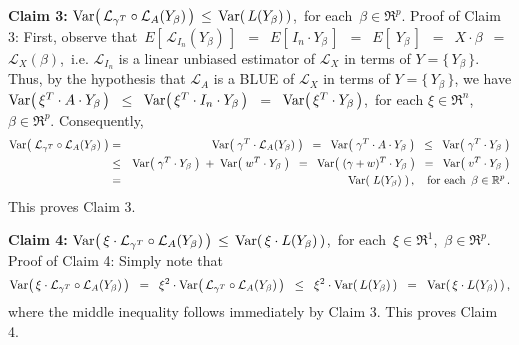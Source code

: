 \vskip 0.5cm
\noindent
\textbf{Claim 3:}\quad
$\textnormal{Var}\!\left(\,\mathcal{L}_{\gamma^{T}}\circ\mathcal{L}_{A}(Y_{\beta})\,\right)
\,\leq\,
	\textnormal{Var}\!\left(\,L(Y_{\beta})\,\right)$,\,
for each \,$\beta\in\Re^{p}$.
\vskip 0.1cm
\noindent
Proof of Claim 3:\quad
First, observe that
\,$E\!\left[\,\mathcal{L}_{I_{n}}(Y_{\beta})\,\right]$
\,$=$\, $E\!\left[\,I_{n} \cdot Y_{\beta}\,\right]$
\,$=$\, $E\!\left[\;Y_{\beta}\,\right]$
\,$=$\, $X \cdot \beta$
\,$=$\, $\mathcal{L}_{X}(\beta)$,\,
i.e. $\mathcal{L}_{I_{n}}$ is a linear unbiased estimator of $\mathcal{L}_{X}$
in terms of $Y = \{\,Y_{\beta}\,\}$.
Thus, by the hypothesis that $\mathcal{L}_{A}$ is a BLUE of $\mathcal{L}_{X}$ in terms of $Y = \{\,Y_{\beta}\,\}$,
we have
$\textnormal{Var}\!\left(\,\xi^{T} \cdot A \cdot Y_{\beta}\,\right)$
\,$\leq$\, $\textnormal{Var}\!\left(\,\xi^{T} \cdot I_{n} \cdot Y_{\beta}\,\right)$
\,$=$\, $\textnormal{Var}\!\left(\,\xi^{T} \cdot Y_{\beta}\,\right)$,\,
for each $\xi \in \Re^{n}$, $\beta\in\Re^{p}$.
Consequently,
\begin{eqnarray*}
\Var\!\left(\; \mathcal{L}_{\gamma^{T}} \circ \mathcal{L}_{A}(Y_{\beta}) \;\right)
&=&
	\Var\!\left(\; \gamma^{T} \cdot \mathcal{L}_{A}(Y_{\beta}) \;\right)
\;\; = \;\;
	\Var\!\left(\; \gamma^{T} \cdot A \cdot Y_{\beta} \;\right)
\;\; \leq \;\;
	\Var\!\left(\; \gamma^{T} \cdot Y_{\beta} \;\right)
\\
&\leq&
	\Var\!\left(\; \gamma^{T} \cdot Y_{\beta} \;\right)
	\; + \;
	\Var\!\left(\; w^{T} \cdot Y_{\beta} \;\right)
\;\;=\;\;
	\Var\!\left(\; (\gamma + w)^{T} \cdot Y_{\beta} \;\right)
\;\; = \;\;
	\Var\!\left(\; v^{T} \cdot Y_{\beta} \;\right)
\\
&=&
	\Var\!\left(\; L(Y_{\beta}) \;\right),
\quad
\textnormal{for each \,$\beta\in\Re^{p}$}\,.
\end{eqnarray*}
This proves Claim 3.

\vskip 0.5cm
\noindent
\textbf{Claim 4:}\quad
$\textnormal{Var}\!\left(\,\xi\cdot\mathcal{L}_{\gamma^{T}}\circ\mathcal{L}_{A}(Y_{\beta})\,\right)
\,\leq\,
	\textnormal{Var}\!\left(\,\xi \cdot L(Y_{\beta})\,\right)$,\,
for each \,$\xi\in\Re^{1}$, \,$\beta\in\Re^{p}$.
\vskip 0.1cm
\noindent
Proof of Claim 4:\quad
Simply note that
\begin{equation*}
\textnormal{Var}\!\left(\,\xi\cdot\mathcal{L}_{\gamma^{T}}\circ\mathcal{L}_{A}(Y_{\beta})\,\right)
\;\; = \;\;
	\xi^{2}\cdot\textnormal{Var}\!\left(\,\mathcal{L}_{\gamma^{T}}\circ\mathcal{L}_{A}(Y_{\beta})\,\right)
\;\; \leq \;\;
	\xi^{2}\cdot\textnormal{Var}\!\left(\,L(Y_{\beta})\,\right)
\;\; = \;\;
	\textnormal{Var}\!\left(\,\xi\cdot L(Y_{\beta})\,\right),
\end{equation*}
where the middle inequality follows immediately by Claim 3.
This proves Claim 4.


